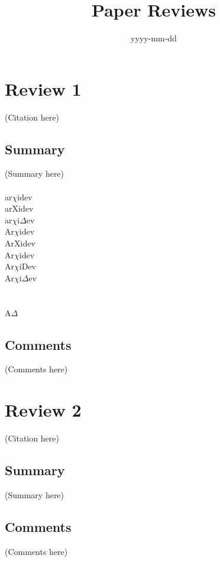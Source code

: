 \documentclass{article}
\begin{document}
\title{Paper Reviews}
\date{yyyy-mm-dd}
\maketitle

\section*{Review 1}
(Citation here)

\subsection*{Summary}
(Summary here)\\
\\
ar$\chi$idev\\
arXidev\\
ar$\chi$i$\Delta$ev\\
Ar$\chi$idev\\
ArXidev\\
Ar$\chi$idev\\
Ar$\chi$iDev\\
Ar$\chi$i$\Delta$ev\\
\\
\\
A$\Delta$

\subsection*{Comments}
(Comments here)

\section*{Review 2}
(Citation here) 

\subsection*{Summary}
(Summary here)

\subsection*{Comments}
(Comments here)
\end{document}
